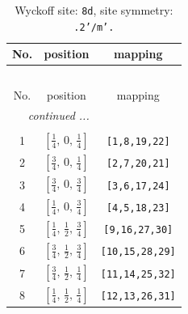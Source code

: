 \documentclass[fleqn,8pt]{jsarticle}
\begin{document}
\begin{longtable}{ccc}
\caption{Wyckoff site: {\tt 8d}, site symmetry: {\tt .2'/m'.}}
 \\
 \hline \hline
No. & position & mapping \\ \hline \endfirsthead

\multicolumn{2}{l}{\tablename\ \thetable{}} \\
 \hline \hline
No. & position & mapping \\ \hline \endhead

 \hline \hline
\multicolumn{2}{r}{\footnotesize\it continued ...} \\ \endfoot

 \hline \hline
\multicolumn{2}{r}{} \\ \endlastfoot

1 & $\left[ \frac{1}{4},\, 0,\, \frac{1}{4} \right]$ & {\tt [1,8,19,22]} \\ \hline
2 & $\left[ \frac{3}{4},\, 0,\, \frac{1}{4} \right]$ & {\tt [2,7,20,21]} \\ \hline
3 & $\left[ \frac{3}{4},\, 0,\, \frac{3}{4} \right]$ & {\tt [3,6,17,24]} \\ \hline
4 & $\left[ \frac{1}{4},\, 0,\, \frac{3}{4} \right]$ & {\tt [4,5,18,23]} \\ \hline
5 & $\left[ \frac{1}{4},\, \frac{1}{2},\, \frac{3}{4} \right]$ & {\tt [9,16,27,30]} \\ \hline
6 & $\left[ \frac{3}{4},\, \frac{1}{2},\, \frac{3}{4} \right]$ & {\tt [10,15,28,29]} \\ \hline
7 & $\left[ \frac{3}{4},\, \frac{1}{2},\, \frac{1}{4} \right]$ & {\tt [11,14,25,32]} \\ \hline
8 & $\left[ \frac{1}{4},\, \frac{1}{2},\, \frac{1}{4} \right]$ & {\tt [12,13,26,31]} \\
\end{longtable}
\renewcommand{\arraystretch}{1.2}
\end{document}
